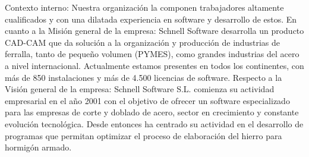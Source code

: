 \documentclass[10pt,a4paper]{article}
\begin{document}
\begin{enumerate}
Contexto interno: Nuestra organización la componen trabajadores altamente cualificados y con una dilatada experiencia en software y desarrollo de estos.
En cuanto a la Misión general de la empresa:
Schnell Software desarrolla un producto CAD-CAM que da solución a la organización y producción de industrias de ferralla, tanto de pequeño volumen (PYMES), como grandes industrias del acero a nivel internacional. Actualmente estamos presentes en todos los continentes, con más de 850 instalaciones y más de 4.500 licencias de software.
Respecto a la Visión general de la empresa:
Schnell Software S.L. comienza su actividad empresarial en el año 2001 con el objetivo de ofrecer un software especializado para las empresas de corte y doblado de acero, sector en crecimiento y constante evolución tecnológica. Desde entonces ha centrado su actividad en el desarrollo de programas que permitan optimizar el proceso de elaboración del hierro para hormigón armado.

\end{enumerate}
\end{document}
